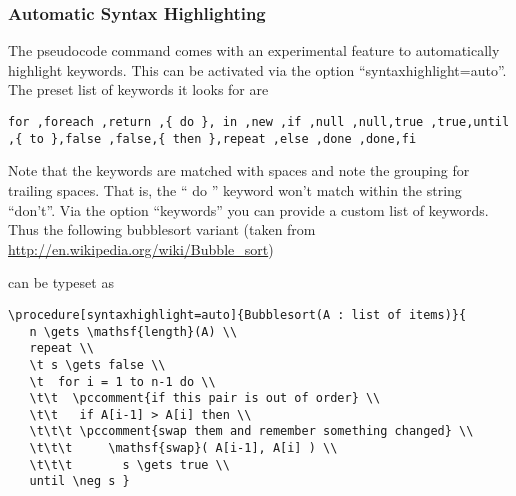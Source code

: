 \documentclass[a4paper]{report}
\begin{document}
\subsubsection{Automatic Syntax Highlighting}
The pseudocode command comes with an experimental feature to automatically highlight keywords. This can be activated via
the option \enquote{syntaxhighlight=auto}. The preset list of keywords it looks for are
\begin{lstlisting}
for ,foreach ,return ,{ do }, in ,new ,if ,null ,null,true ,true,until ,{ to },false ,false,{ then },repeat ,else ,done ,done,fi
\end{lstlisting}
Note that the keywords are matched with spaces and note the grouping for trailing spaces. That is, the \enquote{ do } keyword won't match within the string \enquote{don't}.
Via the option \enquote{keywords} you can provide a custom list of keywords.
Thus the following bubblesort variant (taken from \url{http://en.wikipedia.org/wiki/Bubble_sort})
\begin{center}
\end{center}
can be typeset as
\begin{lstlisting}
\procedure[syntaxhighlight=auto]{Bubblesort(A : list of items)}{
   n \gets \mathsf{length}(A) \\
   repeat \\
   \t s \gets false \\
   \t  for i = 1 to n-1 do \\
   \t\t  \pccomment{if this pair is out of order} \\
   \t\t   if A[i-1] > A[i] then \\
   \t\t\t \pccomment{swap them and remember something changed} \\
   \t\t\t     \mathsf{swap}( A[i-1], A[i] ) \\
   \t\t\t       s \gets true \\
   until \neg s }
\end{lstlisting}
\end{document}
